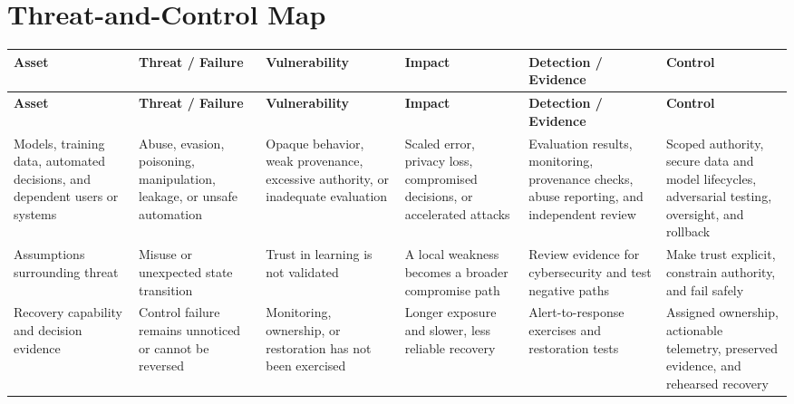\documentclass[11pt,letterpaper]{article}
\begin{document}
\section*{Threat-and-Control Map}
\begingroup\scriptsize\setlength{\tabcolsep}{2pt}
\begin{longtable}{>{\raggedright\arraybackslash}p{}>{\raggedright\arraybackslash}p{}>{\raggedright\arraybackslash}p{}>{\raggedright\arraybackslash}p{}>{\raggedright\arraybackslash}p{}>{\raggedright\arraybackslash}p{}}
\toprule\rowcolor{Navy}\color{white}\textbf{Asset} & \color{white}\textbf{Threat / Failure} & \color{white}\textbf{Vulnerability} & \color{white}\textbf{Impact} & \color{white}\textbf{Detection / Evidence} & \color{white}\textbf{Control}\\\midrule
\endfirsthead
\toprule\rowcolor{Navy}\color{white}\textbf{Asset} & \color{white}\textbf{Threat / Failure} & \color{white}\textbf{Vulnerability} & \color{white}\textbf{Impact} & \color{white}\textbf{Detection / Evidence} & \color{white}\textbf{Control}\\\midrule
\endhead
Models, training data, automated decisions, and dependent users or systems & Abuse, evasion, poisoning, manipulation, leakage, or unsafe automation & Opaque behavior, weak provenance, excessive authority, or inadequate evaluation & Scaled error, privacy loss, compromised decisions, or accelerated attacks & Evaluation results, monitoring, provenance checks, abuse reporting, and independent review & Scoped authority, secure data and model lifecycles, adversarial testing, oversight, and rollback\\\midrule
Assumptions surrounding threat & Misuse or unexpected state transition & Trust in learning is not validated & A local weakness becomes a broader compromise path & Review evidence for cybersecurity and test negative paths & Make trust explicit, constrain authority, and fail safely\\\midrule
Recovery capability and decision evidence & Control failure remains unnoticed or cannot be reversed & Monitoring, ownership, or restoration has not been exercised & Longer exposure and slower, less reliable recovery & Alert-to-response exercises and restoration tests & Assigned ownership, actionable telemetry, preserved evidence, and rehearsed recovery\\\midrule
\bottomrule
\end{longtable}
\endgroup
\end{document}
